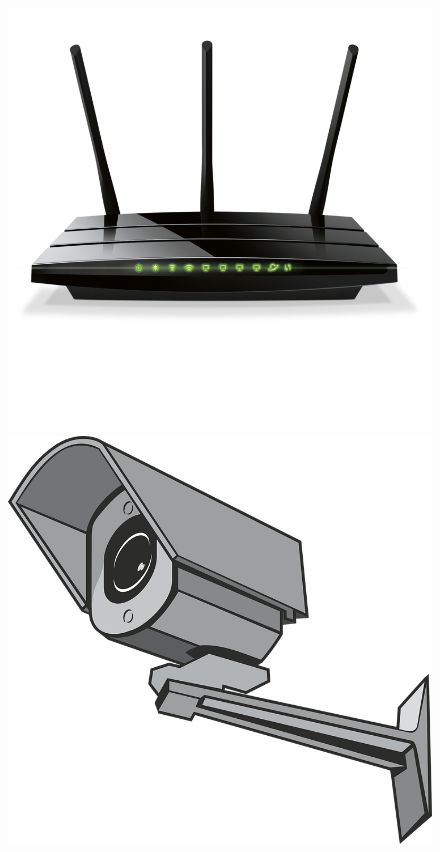 \documentclass[aspectratio=169]{beamer}
\begin{document}
\begin{frame}
\begin{columns}
\begin{figure}
      \includegraphics[scale=0.1]{images/router.png}
      \includegraphics[scale=0.05]{images/surveillance-camera.png}

\end{figure}
\end{columns}
\end{frame}
\end{document}
